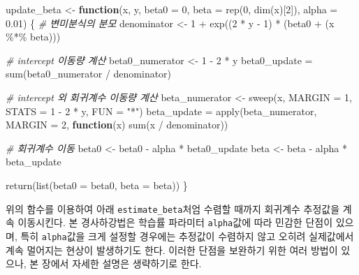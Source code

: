 \documentclass[
]{book}
\newenvironment{Shaded}{\begin{snugshade}}{\end{snugshade}}
\newcommand{\AttributeTok}[1]{\textcolor[rgb]{0.77,0.63,0.00}{#1}}
\newcommand{\CommentTok}[1]{\textcolor[rgb]{0.56,0.35,0.01}{\textit{#1}}}
\newcommand{\ControlFlowTok}[1]{\textcolor[rgb]{0.13,0.29,0.53}{\textbf{#1}}}
\newcommand{\DecValTok}[1]{\textcolor[rgb]{0.00,0.00,0.81}{#1}}
\newcommand{\FloatTok}[1]{\textcolor[rgb]{0.00,0.00,0.81}{#1}}
\newcommand{\FunctionTok}[1]{\textcolor[rgb]{0.00,0.00,0.00}{#1}}
\newcommand{\NormalTok}[1]{#1}
\newcommand{\OtherTok}[1]{\textcolor[rgb]{0.56,0.35,0.01}{#1}}
\newcommand{\SpecialCharTok}[1]{\textcolor[rgb]{0.00,0.00,0.00}{#1}}
\newcommand{\StringTok}[1]{\textcolor[rgb]{0.31,0.60,0.02}{#1}}
\begin{document}
\begin{Shaded}
\begin{Highlighting}[]
\NormalTok{update\_beta }\OtherTok{\textless{}{-}} \ControlFlowTok{function}\NormalTok{(x, y, }\AttributeTok{beta0 =} \DecValTok{0}\NormalTok{, }\AttributeTok{beta =} \FunctionTok{rep}\NormalTok{(}\DecValTok{0}\NormalTok{, }\FunctionTok{dim}\NormalTok{(x)[}\DecValTok{2}\NormalTok{]), }\AttributeTok{alpha =} \FloatTok{0.01}\NormalTok{) \{}
  \CommentTok{\# 변미분식의 분모}
\NormalTok{  denominator }\OtherTok{\textless{}{-}} \DecValTok{1} \SpecialCharTok{+} \FunctionTok{exp}\NormalTok{((}\DecValTok{2} \SpecialCharTok{*}\NormalTok{ y }\SpecialCharTok{{-}} \DecValTok{1}\NormalTok{) }\SpecialCharTok{*}\NormalTok{ (beta0 }\SpecialCharTok{+}\NormalTok{ (x }\SpecialCharTok{\%*\%}\NormalTok{ beta)))}

  \CommentTok{\# intercept 이동량 계산}
\NormalTok{  beta0\_numerator }\OtherTok{\textless{}{-}} \DecValTok{1} \SpecialCharTok{{-}} \DecValTok{2} \SpecialCharTok{*}\NormalTok{ y}
\NormalTok{  beta0\_update }\OtherTok{=} \FunctionTok{sum}\NormalTok{(beta0\_numerator }\SpecialCharTok{/}\NormalTok{ denominator)}
  
  \CommentTok{\# intercept 외 회귀계수 이동량 계산}
\NormalTok{  beta\_numerator }\OtherTok{\textless{}{-}} \FunctionTok{sweep}\NormalTok{(x, }\AttributeTok{MARGIN =} \DecValTok{1}\NormalTok{, }\AttributeTok{STATS =} \DecValTok{1} \SpecialCharTok{{-}} \DecValTok{2} \SpecialCharTok{*}\NormalTok{ y, }\AttributeTok{FUN =} \StringTok{"*"}\NormalTok{)}
\NormalTok{  beta\_update }\OtherTok{=} \FunctionTok{apply}\NormalTok{(beta\_numerator, }\AttributeTok{MARGIN =} \DecValTok{2}\NormalTok{, }
                      \ControlFlowTok{function}\NormalTok{(x) }\FunctionTok{sum}\NormalTok{(x }\SpecialCharTok{/}\NormalTok{ denominator))}

  \CommentTok{\# 회귀계수 이동}
\NormalTok{  beta0 }\OtherTok{\textless{}{-}}\NormalTok{ beta0 }\SpecialCharTok{{-}}\NormalTok{ alpha }\SpecialCharTok{*}\NormalTok{ beta0\_update}
\NormalTok{  beta }\OtherTok{\textless{}{-}}\NormalTok{ beta }\SpecialCharTok{{-}}\NormalTok{ alpha }\SpecialCharTok{*}\NormalTok{ beta\_update}

  \FunctionTok{return}\NormalTok{(}\FunctionTok{list}\NormalTok{(}\AttributeTok{beta0 =}\NormalTok{ beta0, }\AttributeTok{beta =}\NormalTok{ beta))}
\NormalTok{\}}
\end{Highlighting}
\end{Shaded}

위의 함수를 이용하여 아래 \texttt{estimate\_beta}처엄 수렴할 때까지 회귀계수 추정값을 계속 이동시킨다. 본 경사하강법은 학습률 파라미터 \texttt{alpha}값에 따라 민감한 단점이 있으며, 특히 \texttt{alpha}값을 크게 설정할 경우에는 추정값이 수렴하지 않고 오히려 실제값에서 계속 멀어지는 현상이 발생하기도 한다. 이러한 단점을 보완하기 위한 여러 방법이 있으나, 본 장에서 자세한 설명은 생략하기로 한다.
\end{document}
